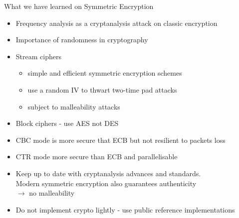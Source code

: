 \documentclass[aspectratio=169, lualatex, handout, 10pt,dvipsnames,svgnames]{beamer} %
\begin{document}
\begin{frame}{What we have learned on Symmetric Encryption}
  \vspace{-0.5cm}
  \begin{itemize}
  \item Frequency analysis as a cryptanalysis attack on classic encryption\medskip
  \item Importance of randomness in cryptography\medskip
  \item Stream ciphers
    \begin{itemize}
    \item simple and efficient symmetric encryption schemes 
    \item use a random IV to thwart two-time pad attacks
    \item subject to malleability attacks\medskip
    \end{itemize}
  \item Block ciphers - use AES not DES\medskip
  \item CBC mode is more secure that ECB but not resilient to packets loss\medskip
  \item CTR mode more secure than ECB and parallelisable \medskip
  \item Keep up to date with cryptanalysis advances and standards.\\  
  Modern symmetric encryption also guarantees authenticity \\$\rightarrow$ no malleability
  \medskip
  \item Do not implement crypto lightly - use public reference implementations
 \end{itemize}
\end{frame}
\end{document}
